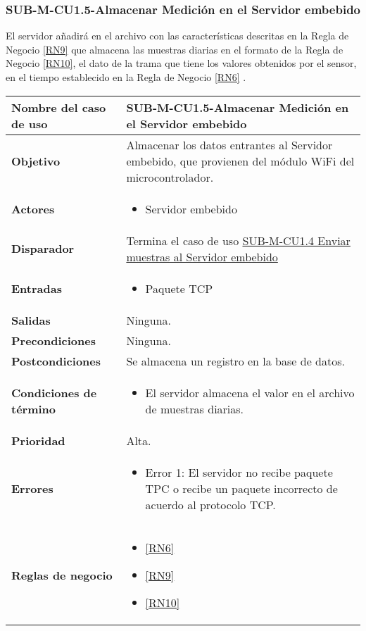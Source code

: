 \subsubsection{SUB-M-CU1.5-Almacenar Medición en el Servidor embebido}\label{SUB-M-CU1.5}
El servidor añadirá en el archivo con las características descritas en la Regla de Negocio \ref{RN9} que almacena las muestras diarias en el formato de la Regla de Negocio \ref{RN10}, el dato de la trama que tiene los valores obtenidos por el sensor, en el tiempo establecido en la Regla de Negocio \ref{RN6} .
\begin{longtable}{|J{5cm}|J{10.3cm}|}
	\hline
	\textbf{Nombre del caso de uso} &
		SUB-M-CU1.5-Almacenar Medición en el Servidor embebido\\ \hline
	\textbf{Objetivo} &
		Almacenar los datos entrantes al Servidor embebido, que provienen del módulo WiFi del microcontrolador. \\ \hline
	\textbf{Actores} &
		\begin{itemize}
			\item Servidor embebido
		\end{itemize} \\ \hline
	\textbf{Disparador} & 
	    Termina el caso de uso \hyperref[SUB-M-CU1.4]{SUB-M-CU1.4 Enviar muestras al Servidor embebido} \\ \hline 
	\textbf{Entradas} & 
		\begin{itemize}
				\item Paquete TCP
		\end{itemize}\\ \hline 
	\textbf{Salidas} & 
        Ninguna. \\ \hline
	\textbf{Precondiciones} &
	    Ninguna. \\ \hline
	\textbf{Postcondiciones} &
		Se almacena un registro en la base de datos.\\ \hline
	\textbf{Condiciones de término} & 
		\begin{itemize}
			\item El servidor almacena el valor en el archivo de muestras diarias.
		\end{itemize} \\ \hline 
	\textbf{Prioridad} & 
		Alta. \\ \hline
	\textbf{Errores} & 
		\begin{itemize}
		    \item \label{CU11:Error1} Error 1: El servidor no recibe paquete TPC o recibe un paquete incorrecto de acuerdo al protocolo TCP.
		\end{itemize} \\ \hline
	\textbf{Reglas de negocio} & 
		\begin{itemize}
            \item \ref{RN6}
            \item \ref{RN9}
            \item \ref{RN10}
		\end{itemize} \\ \hline

\end{longtable}

